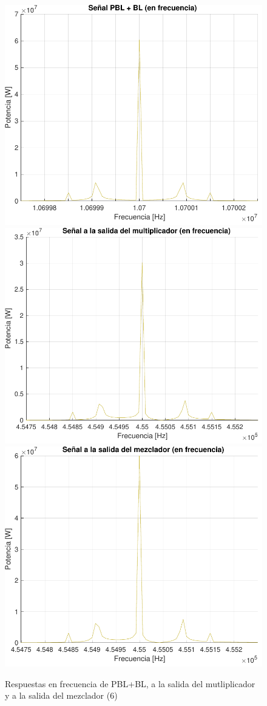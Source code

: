 \begin{figure}[!htb]
    \centering
    \includegraphics[width=0.45\linewidth]{include//figures/pbl+blhz.pdf}
    \includegraphics[width=0.45\linewidth]{include//figures/multiplicadorhz.pdf}
    \includegraphics[width=0.5\linewidth]{include//figures/muestreo.pdf}
    \caption{Respuestas en frecuencia de PBL+BL, a la salida del mutliplicador y a la salida del mezclador (6)} 
\end{figure}


